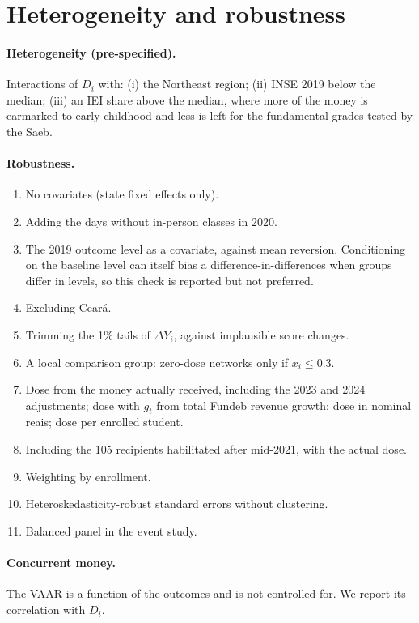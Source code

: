\documentclass[11pt]{article}
\begin{document}
\section{Heterogeneity and robustness}\label{sec:robustez}

\paragraph{Heterogeneity (pre-specified).} Interactions of $D_i$ with: (i) the Northeast region; (ii) INSE 2019 below the median; (iii) an IEI share above the median, where more of the money is earmarked to early childhood and less is left for the fundamental grades tested by the Saeb.

\paragraph{Robustness.}
\begin{enumerate}
\item No covariates (state fixed effects only).
\item Adding the days without in-person classes in 2020.
\item The 2019 outcome level as a covariate, against mean reversion. Conditioning on the baseline level can itself bias a difference-in-differences when groups differ in levels, so this check is reported but not preferred.
\item Excluding Ceará.
\item Trimming the 1\% tails of $\Delta Y_i$, against implausible score changes.
\item A local comparison group: zero-dose networks only if $x_i \le 0.3$.
\item Dose from the money actually received, including the 2023 and 2024 adjustments; dose with $g_t$ from total Fundeb revenue growth; dose in nominal reais; dose per enrolled student.
\item Including the 105 recipients habilitated after mid-2021, with the actual dose.
\item Weighting by enrollment.
\item Heteroskedasticity-robust standard errors without clustering.
\item Balanced panel in the event study.
\end{enumerate}

\paragraph{Concurrent money.} The VAAR is a function of the outcomes and is not controlled for. We report its correlation with $D_i$.
\end{document}
